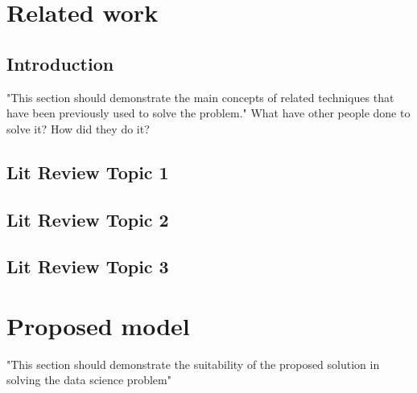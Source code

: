 \documentclass[12pt]{report}
\newcommand{\para}{\vspace{7pt}\noindent}
\begin{document}
\chapter{Related work}


\section{Introduction}
"This section should demonstrate the main concepts
of related techniques that have been previously used to solve the problem."
\para What have other people done to solve it? How did they do it? 


\section{Lit Review Topic 1}

\section{Lit Review Topic 2}

\section{Lit Review Topic 3}


\chapter{Proposed model}
"This section should demonstrate the suitability of
the proposed solution in solving the data science problem"





\printbibliography


\end{document}
